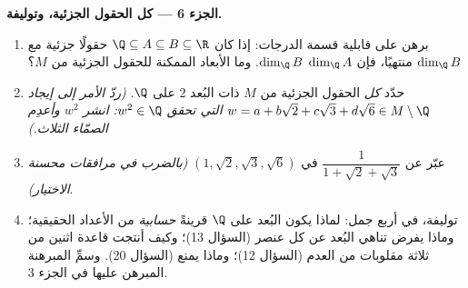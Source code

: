 \begin{problem}
\medskip
\noindent\textbf{الجزء 6 --- كل الحقول الجزئية، وتوليفة.}
\begin{enumerate}[resume]
  \item برهن على قابلية قسمة الدرجات: إذا كان $\Q \subseteq A
        \subseteq B \subseteq \R$ حقولًا جزئية مع $\dim_\Q B$
        منتهيًا، فإن $\dim_\Q A$  $\dim_\Q B$. وما
        الأبعاد الممكنة للحقول الجزئية من $M$؟
  \item حدّد \emph{كل} الحقول الجزئية من $M$ ذات البُعد $2$
        على $\Q$. \emph{(ردّ الأمر إلى إيجاد $w = a + b\sqrt2
        + c\sqrt3 + d\sqrt6 \in M \setminus \Q$ التي تحقق $w^2 \in
        \Q$: انشر $w^2$ وأعدِم  الصمّاء
        الثلاث.)}
  \item عبّر عن $\dfrac1{1 + \sqrt2 + \sqrt3}$ في  $(1,
        \sqrt2, \sqrt3, \sqrt6)$ \emph{(بالضرب في مرافقات
        محسنة الاختيار)}.
  \item توليفة، في أربع جمل: لماذا يكون البُعد على $\Q$
        قرينةً \emph{حسابية}  من الأعداد الحقيقية؛ وماذا
        يفرض تناهي البُعد عن كل عنصر
        (السؤال 13)؛ وكيف أنتجت قاعدة اثنين من ثلاثة
        مقلوبات من العدم (السؤال 12)؛ وماذا يمنع
         (السؤال 20). وسمِّ المبرهنة المبرهن عليها
        في الجزء 3.
\end{enumerate}
\end{problem}
